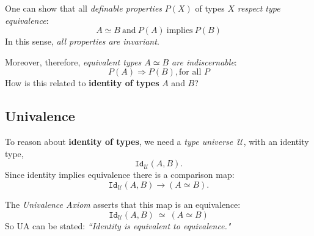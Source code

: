 \documentclass[11pt]{article}
\newcommand{\toarrow}{\ensuremath{\rightarrow}}
\newcommand{\myemph}[1]{\textbf{#1}}    %
\newcommand{\U}{\mathcal{U}}
\newcommand{\id}[1]{\texttt{Id}_{#1}}
\begin{document}
One can show that  all \emph{definable properties} $P(X)$ of types $X$ \emph{respect type equivalence}:
\[
A \simeq B\ \text{and}\ P(A)\ \text{implies}\ P(B)
\]
In this sense, \emph{all properties are invariant}.

Moreover, therefore, \emph{equivalent types $A \simeq B$ are indiscernable}:
\[
P(A) \Rightarrow P(B), \text{for all $P$}
\]
How is this related to \myemph{identity of types} $A$ and $B$?

\subsection*{Univalence}

To reason about \myemph{identity of types}, we need a \emph{type universe}\ $\U$, with an identity type,
\[
\id{\U}(A,B).
\]
Since identity implies equivalence there is a comparison map:
\[
\id{\U}(A,B) \toarrow (A \simeq B).
\]

The \emph{Univalence Axiom} asserts that this map is an equivalence:
\begin{equation}\tag{UA}
\id{\U}(A,B)\ \simeq\ (A \simeq B)
\end{equation}
%
So UA can be stated: \emph{``Identity is equivalent to equivalence."}


%
%
%
%
%
\end{document}
